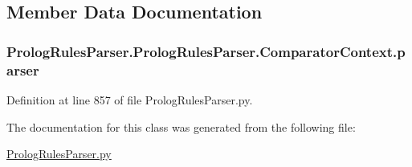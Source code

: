 \subsection{Member Data Documentation}
\hypertarget{class_prolog_rules_parser_1_1_prolog_rules_parser_1_1_comparator_context_ac4400f4e8f1a4122592bfc45e9902bc2}{}
\subsubsection[{parser}]{\setlength{\rightskip}{0pt plus 5cm}Prolog\+Rules\+Parser.\+Prolog\+Rules\+Parser.\+Comparator\+Context.\+parser}\label{class_prolog_rules_parser_1_1_prolog_rules_parser_1_1_comparator_context_ac4400f4e8f1a4122592bfc45e9902bc2}


Definition at line 857 of file Prolog\+Rules\+Parser.\+py.



The documentation for this class was generated from the following file\+:\begin{DoxyCompactItemize}
\item 
\hyperlink{_prolog_rules_parser_8py}{Prolog\+Rules\+Parser.\+py}\end{DoxyCompactItemize}
